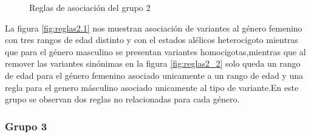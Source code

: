 \begin{figure}[h!]
	\centering
	\caption{Reglas de asociación del grupo 2}\label{fig:reglas2}
\end{figure}

La figura \ref{fig:reglas2.1} nos muestran asociación de variantes al género femenino con tres rangos de edad distinto y con el estados alélicos heterocigoto mientras que para el género masculino se presentan variantes homocigotas,mientras que al remover las variantes sinónimas en la figura \ref{fig:reglas2_2} solo queda un rango de edad para el género femenino asociado unicamente a un rango de edad y una regla para el genero másculino asociado unicamente al tipo de variante.En este grupo se observan dos reglas no relacionadas para cada género.

\subsubsection*{Grupo 3}

